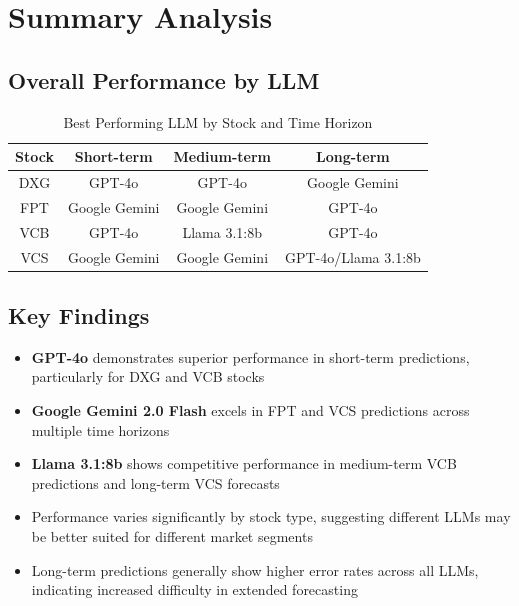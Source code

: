 \documentclass{article}
\begin{document}
\section{Summary Analysis}

\subsection{Overall Performance by LLM}

\begin{table}[h!]
\centering
\caption{Best Performing LLM by Stock and Time Horizon}
\begin{tabular}{c|c|c|c}
\toprule
\textbf{Stock} & \textbf{Short-term} & \textbf{Medium-term} & \textbf{Long-term} \\
\midrule
DXG & GPT-4o & GPT-4o & Google Gemini \\
FPT & Google Gemini & Google Gemini & GPT-4o \\
VCB & GPT-4o & Llama 3.1:8b & GPT-4o \\
VCS & Google Gemini & Google Gemini & GPT-4o/Llama 3.1:8b \\
\bottomrule
\end{tabular}
\end{table}

\subsection{Key Findings}

\begin{itemize}
\item \textbf{GPT-4o} demonstrates superior performance in short-term predictions, particularly for DXG and VCB stocks
\item \textbf{Google Gemini 2.0 Flash} excels in FPT and VCS predictions across multiple time horizons
\item \textbf{Llama 3.1:8b} shows competitive performance in medium-term VCB predictions and long-term VCS forecasts
\item Performance varies significantly by stock type, suggesting different LLMs may be better suited for different market segments
\item Long-term predictions generally show higher error rates across all LLMs, indicating increased difficulty in extended forecasting
\end{itemize}
\end{document}
